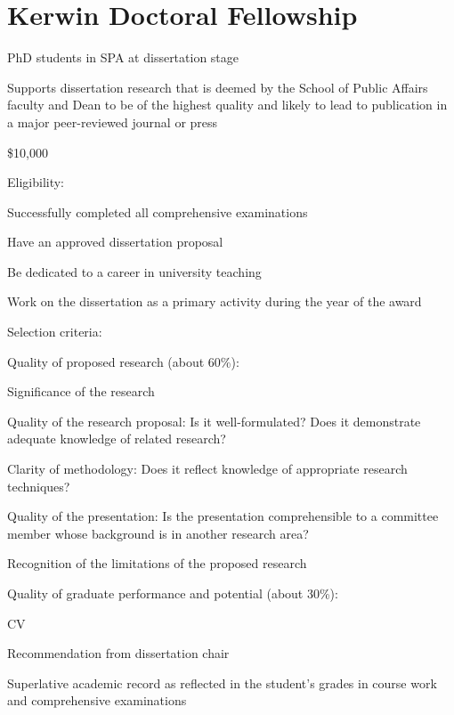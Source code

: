 \section*{Kerwin Doctoral Fellowship}
	\begin{coi}
		\item PhD students in SPA at dissertation stage
		\item Supports dissertation research that is deemed by the School of Public Affairs faculty and Dean to be of the highest quality and likely to lead to publication in a major peer-reviewed journal or press
		\item \$10,000
		\item Eligibility:
			\begin{coi}
				\item Successfully completed all comprehensive examinations
				\item Have an approved dissertation proposal
				\item Be dedicated to a career in university teaching
				\item Work on the dissertation as a primary activity during the year of the award
			\end{coi}
		\item Selection criteria:
			\begin{coi}
				\item Quality of proposed research (about 60\%):
					\begin{coi}
						\item Significance of the research
						\item Quality of the research proposal: Is it well-formulated? Does it demonstrate adequate knowledge of related research?
						\item Clarity of methodology: Does it reflect knowledge of appropriate research techniques?
						\item Quality of the presentation: Is the presentation comprehensible to a committee member whose background is in another research area?
						\item Recognition of the limitations of the proposed research
					\end{coi}
				\item Quality of graduate performance and potential (about 30\%):
					\begin{coi}
						\item CV
						\item Recommendation from dissertation chair
						\item Superlative academic record as reflected in the student's grades in course work and comprehensive examinations

\end{coi}
\end{coi}
\end{coi}
